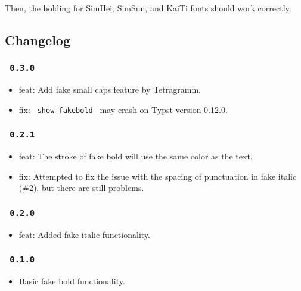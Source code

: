 Then, the bolding for SimHei, SimSun, and KaiTi fonts should work
correctly.

\subsection{Changelog}\label{changelog}

\subsubsection{\texorpdfstring{\texttt{\ 0.3.0\ }}{ 0.3.0 }}\label{section}

\begin{itemize}
\tightlist
\item
  feat: Add fake small caps feature by Tetragramm.
\item
  fix: \texttt{\ show-fakebold\ } may crash on Typst version 0.12.0.
\end{itemize}

\subsubsection{\texorpdfstring{\texttt{\ 0.2.1\ }}{ 0.2.1 }}\label{section-1}

\begin{itemize}
\tightlist
\item
  feat: The stroke of fake bold will use the same color as the text.
\item
  fix: Attempted to fix the issue with the spacing of punctuation in
  fake italic (\#2), but there are still problems.
\end{itemize}

\subsubsection{\texorpdfstring{\texttt{\ 0.2.0\ }}{ 0.2.0 }}\label{section-2}

\begin{itemize}
\tightlist
\item
  feat: Added fake italic functionality.
\end{itemize}

\subsubsection{\texorpdfstring{\texttt{\ 0.1.0\ }}{ 0.1.0 }}\label{section-3}

\begin{itemize}
\tightlist
\item
  Basic fake bold functionality.
\end{itemize}

